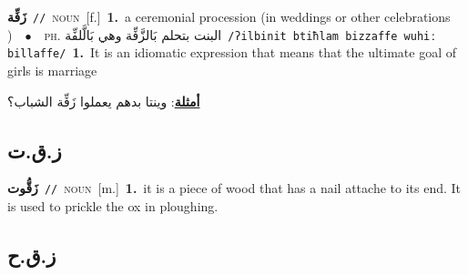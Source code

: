 \documentclass[10pt,a4paper,twoside]{article} %
\begin{document}
\begin{multicols}{2}
{\setlength\topsep{0pt}\textbf{\foreignlanguage{arabic}{زَفِّة}}\ {\color{gray}\texttt{//}\color{black}}\ \textsc{noun}\ [f.]\ \textbf{1.}~a ceremonial procession (in weddings or other celebrations )\ \ $\bullet$\ \ \textsc{ph.} \color{gray} \foreignlanguage{arabic}{البنت بتحلم بَالزَّفِّة وهي بَالَّلفِّة}\color{black}\ {\color{gray}\texttt{/{\sffamily ʔilbinit btiħlam bizzaffe wuhiː billaffe}/}\color{black}}\ \textbf{1.}~It is an idiomatic expression that means that the ultimate goal of girls is marriage\  \begin{flushright}\color{gray}\foreignlanguage{arabic}{\textbf{\underline{\foreignlanguage{arabic}{أمثلة}}}: وينتا بدهم يعملوا زَفِّة الشباب؟}\end{flushright}\color{black}} \vspace{2mm}

\vspace{-3mm}
\subsection*{\color{blue}\foreignlanguage{arabic}{ز.ق.ت}\color{blue}{}} 

{\setlength\topsep{0pt}\textbf{\foreignlanguage{arabic}{زَقُّوت}}\ {\color{gray}\texttt{//}\color{black}}\ \textsc{noun}\ [m.]\ \textbf{1.}~it is a piece of wood that has a nail attache to its end. It is used to prickle the ox in ploughing.\ } \vspace{2mm}

\vspace{-3mm}
\subsection*{\color{blue}\foreignlanguage{arabic}{ز.ق.ح}\color{blue}{}} 


\end{multicols}
\end{document}
